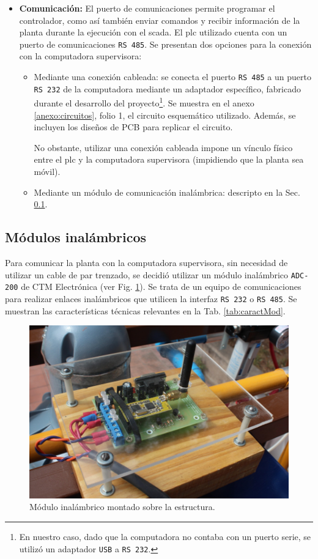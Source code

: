 \begin{itemize}
\item \textbf{Comunicación:} El puerto de comunicaciones permite programar el 
controlador, como así también enviar comandos y recibir información de
la planta durante la ejecución con el \gls{scada}.
El \gls{plc} utilizado cuenta con un puerto de comunicaciones \verb|RS 485|.
Se presentan dos opciones para la conexión con la computadora supervisora:
\begin{itemize}
 \item Mediante una conexión cableada:
 se conecta el puerto \verb|RS 485| a un puerto \verb|RS 232| de la computadora
mediante un adaptador específico, fabricado durante el desarrollo del
proyecto\footnote{En nuestro caso, dado que la computadora no contaba con un
puerto serie, se utilizó un adaptador
\texttt{USB} a \texttt{RS 232}.}.
Se muestra en el anexo \ref{anexo:circuitos}, folio 1, el circuito esquemático
utilizado.
Además, se incluyen los diseños de PCB para replicar el circuito.

No obstante, utilizar una conexión cableada impone un vínculo físico entre
el \gls{plc} y la computadora supervisora (impidiendo que la planta sea móvil).
\item Mediante un módulo de comunicación inalámbrica:
descripto en la Sec. \ref{subsec:inalambrico}.
\end{itemize}
\end{itemize}

\subsection{Módulos inalámbricos}
\label{subsec:inalambrico}

Para comunicar la planta con la computadora supervisora, sin necesidad de
utilizar un cable de par trenzado, se decidió utilizar un módulo inalámbrico
\verb|ADC-200| de CTM Electrónica (ver Fig. \ref{fig:fotoModuloIn}).
Se trata de un equipo de comunicaciones para realizar enlaces inalámbricos que
utilicen la interfaz \verb|RS 232| o \verb|RS 485|.
Se muestran las características técnicas relevantes en la Tab.
\ref{tab:caractMod}.

\begin{figure}[t]
\centering
\includegraphics[width=.6\textwidth]{Cap3-TableroElectrico/Images/IMG_5038.JPG}
 \caption{Módulo inalámbrico montado sobre la estructura.}
 \label{fig:fotoModuloIn}
\end{figure}

